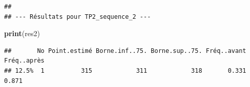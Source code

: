 \documentclass[
]{article}
\newenvironment{Shaded}{\begin{snugshade}}{\end{snugshade}}
\newcommand{\FunctionTok}[1]{\textcolor[rgb]{0.13,0.29,0.53}{\textbf{#1}}}
\newcommand{\NormalTok}[1]{#1}
\begin{document}
\begin{verbatim}
## 
## --- Résultats pour TP2_sequence_2 ---
\end{verbatim}

\begin{Shaded}
\begin{Highlighting}[]
\FunctionTok{print}\NormalTok{(res2)}
\end{Highlighting}
\end{Shaded}

\begin{verbatim}
##       No Point.estimé Borne.inf..75. Borne.sup..75. Fréq..avant Fréq..après
## 12.5%  1          315            311            318       0.331       0.871
\end{verbatim}
\end{document}
